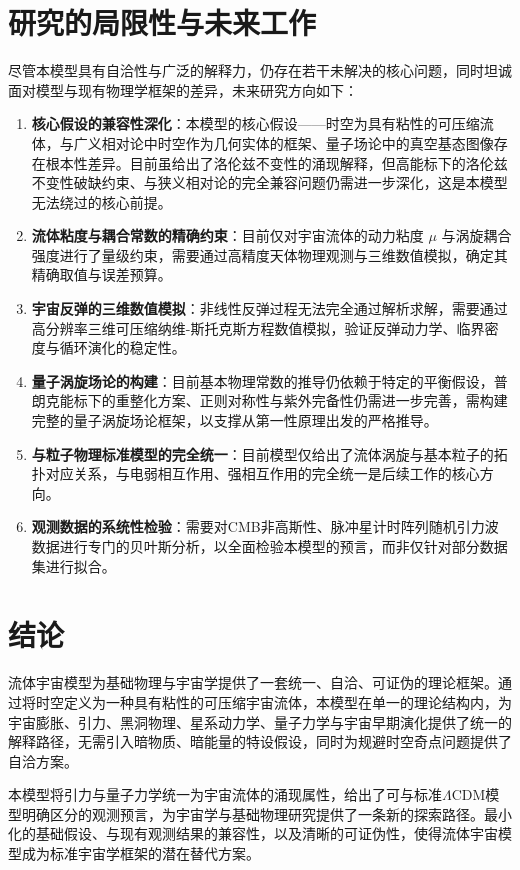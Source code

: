 \documentclass[aps,prd,preprint,superscriptaddress,floatfix]{revtex4-2}
\begin{document}
\section{研究的局限性与未来工作}
尽管本模型具有自洽性与广泛的解释力，仍存在若干未解决的核心问题，同时坦诚面对模型与现有物理学框架的差异，未来研究方向如下：
\begin{enumerate}
    \item \textbf{核心假设的兼容性深化}：本模型的核心假设——时空为具有粘性的可压缩流体，与广义相对论中时空作为几何实体的框架、量子场论中的真空基态图像存在根本性差异。目前虽给出了洛伦兹不变性的涌现解释，但高能标下的洛伦兹不变性破缺约束、与狭义相对论的完全兼容问题仍需进一步深化，这是本模型无法绕过的核心前提。
    \item \textbf{流体粘度与耦合常数的精确约束}：目前仅对宇宙流体的动力粘度 $\mu$ 与涡旋耦合强度进行了量级约束，需要通过高精度天体物理观测与三维数值模拟，确定其精确取值与误差预算。
    \item \textbf{宇宙反弹的三维数值模拟}：非线性反弹过程无法完全通过解析求解，需要通过高分辨率三维可压缩纳维-斯托克斯方程数值模拟，验证反弹动力学、临界密度与循环演化的稳定性。
    \item \textbf{量子涡旋场论的构建}：目前基本物理常数的推导仍依赖于特定的平衡假设，普朗克能标下的重整化方案、正则对称性与紫外完备性仍需进一步完善，需构建完整的量子涡旋场论框架，以支撑从第一性原理出发的严格推导。
    \item \textbf{与粒子物理标准模型的完全统一}：目前模型仅给出了流体涡旋与基本粒子的拓扑对应关系，与电弱相互作用、强相互作用的完全统一是后续工作的核心方向。
    \item \textbf{观测数据的系统性检验}：需要对CMB非高斯性、脉冲星计时阵列随机引力波数据进行专门的贝叶斯分析，以全面检验本模型的预言，而非仅针对部分数据集进行拟合。
\end{enumerate}

\section{结论}
流体宇宙模型为基础物理与宇宙学提供了一套统一、自洽、可证伪的理论框架。通过将时空定义为一种具有粘性的可压缩宇宙流体，本模型在单一的理论结构内，为宇宙膨胀、引力、黑洞物理、星系动力学、量子力学与宇宙早期演化提供了统一的解释路径，无需引入暗物质、暗能量的特设假设，同时为规避时空奇点问题提供了自洽方案。

本模型将引力与量子力学统一为宇宙流体的涌现属性，给出了可与标准$\Lambda$CDM模型明确区分的观测预言，为宇宙学与基础物理研究提供了一条新的探索路径。最小化的基础假设、与现有观测结果的兼容性，以及清晰的可证伪性，使得流体宇宙模型成为标准宇宙学框架的潜在替代方案。
\end{document}
